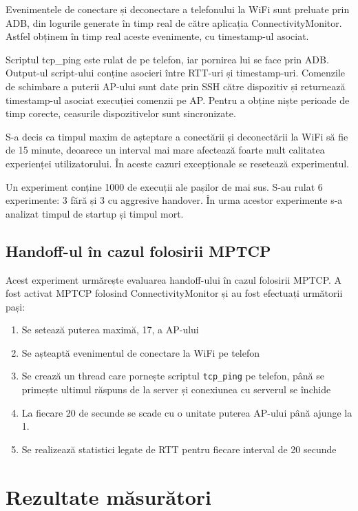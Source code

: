 Evenimentele de conectare și deconectare a telefonului la WiFi sunt preluate prin ADB, din logurile generate în timp real de către aplicația ConnectivityMonitor. Astfel obținem în timp real aceste evenimente, cu timestamp-ul asociat.

Scriptul tcp\_ping este rulat de pe telefon, iar pornirea lui se face prin ADB. Output-ul script-ului conține asocieri între RTT-uri și timestamp-uri. Comenzile de schimbare a puterii AP-ului sunt date prin SSH către dispozitiv și returnează timestamp-ul asociat execuției comenzii pe AP. Pentru a obține niște perioade de timp corecte, ceasurile dispozitivelor sunt sincronizate.

S-a decis ca timpul maxim de așteptare a conectării și deconectării la WiFi să fie de 15 minute, deoarece un interval mai mare afectează foarte mult calitatea experienței utilizatorului. În aceste cazuri excepționale se resetează experimentul.

Un experiment conține 1000 de execuții ale pașilor de mai sus. S-au rulat 6 experimente: 3 fără și 3 cu aggresive handover. În urma acestor experimente s-a analizat timpul de startup și timpul mort.

\subsection{Handoff-ul în cazul folosirii MPTCP}

Acest experiment urmărește evaluarea handoff-ului în cazul folosirii MPTCP. A fost activat MPTCP folosind ConnectivityMonitor și au fost efectuați următorii pași:
\begin{enumerate}
	\item Se setează puterea maximă, 17,  a AP-ului
	\item Se așteaptă evenimentul de conectare la WiFi pe telefon
	\item Se crează un thread care pornește scriptul \texttt{tcp\_ping} pe telefon, până se primește ultimul răspuns de la server și conexiunea cu serverul se închide
	\item La fiecare 20 de secunde se scade cu o unitate puterea AP-ului până ajunge la 1.
	\item Se realizează statistici legate de RTT pentru fiecare interval de 20 secunde
\end{enumerate}

\section{Rezultate măsurători}

